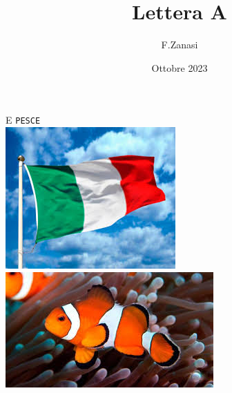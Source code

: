 \documentclass[]{article}
\title{Lettera A}
\author{F.Zanasi}
\date{Ottobre 2023}
\begin{document}
{\fontsize{150}{160}\selectfont E} 
\hspace{2.0in}
{\fontsize{80}{80}\color{black}\texttt{P}\color{blue}\texttt{E}\color{black}\texttt{SC}\color{blue}\texttt{E}} 
\\[2cm]
\includegraphics[scale=0.3]{flag-IT1}
\includegraphics[scale=0.4]{pesce}
\end{document}
